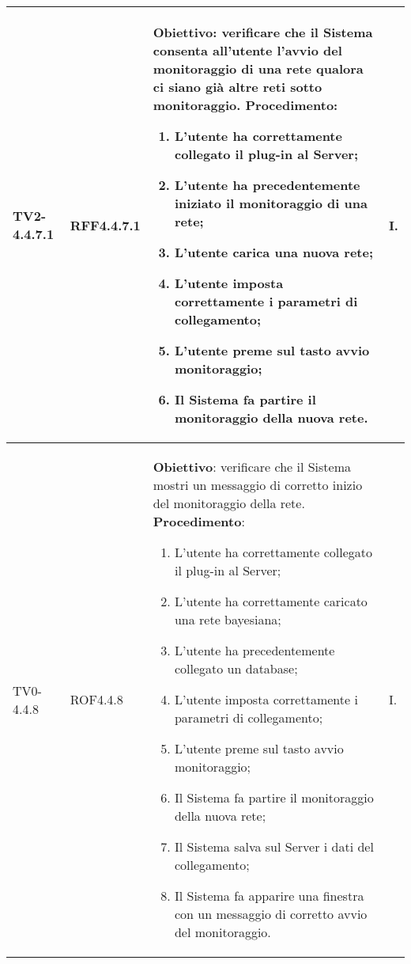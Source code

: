 \begin{longtable}{|C{.15\textwidth}|C{.13\textwidth}|m{.52\textwidth}|C{.08\textwidth}|}
TV2-4.4.7.1 & RFF4.4.7.1 &
	\textbf{Obiettivo}: verificare che il Sistema consenta all'utente l'avvio del monitoraggio di una rete qualora ci siano già altre reti sotto monitoraggio. \newline
	\textbf{Procedimento}:
	\begin{enumerate}
		\item L'utente ha correttamente collegato il plug-in al Server;
		\item L'utente ha precedentemente iniziato il monitoraggio di una rete;
		\item L'utente carica una nuova rete;
		\item L'utente imposta correttamente i parametri di collegamento;
		\item L'utente preme sul tasto avvio monitoraggio;
		\item Il Sistema fa partire il monitoraggio della nuova rete.
	\end{enumerate}
	& I. \\
\hline

TV0-4.4.8 & ROF4.4.8 &
	\textbf{Obiettivo}: verificare che il Sistema mostri un messaggio di corretto inizio del monitoraggio della rete. \newline
	\textbf{Procedimento}:
	\begin{enumerate}
		\item L'utente ha correttamente collegato il plug-in al Server;
		\item L'utente ha correttamente caricato una rete bayesiana;
		\item L'utente ha precedentemente collegato un database;
		\item L'utente imposta correttamente i parametri di collegamento;
		\item L'utente preme sul tasto avvio monitoraggio;
		\item Il Sistema fa partire il monitoraggio della nuova rete;
		\item Il Sistema salva sul Server i dati del collegamento;
		\item Il Sistema fa apparire una finestra con un messaggio di corretto avvio del monitoraggio.
	\end{enumerate}
	& I. \\
\hline


\end{longtable}
